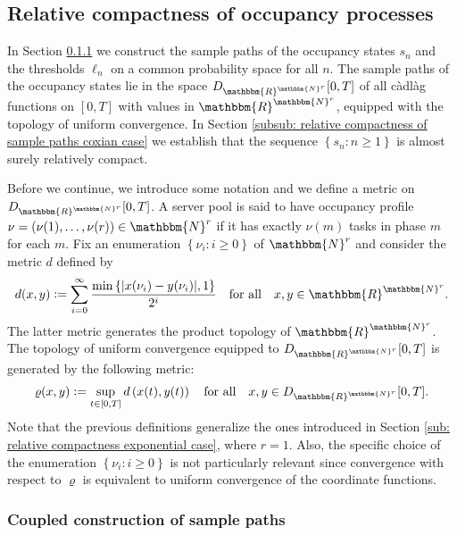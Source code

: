 \documentclass[a4paper, 12pt]{article}
\theoremstyle{definition}
\newcommand{\set}[2]{\left\{#1 : #2\right\}}
\newcommand{\defeq}{\vcentcolon=}
\newcommand{\N}{\mathbbm{N}}
\newcommand{\R}{\mathbbm{R}}
\begin{document}
\subsection{Relative compactness of occupancy processes}
\label{sub: relative compactness coxian case}

In Section \ref{subsub: coupled construction of sample paths coxian case} we construct the sample paths of the occupancy states $s_n$ and the thresholds $\ell_n$ on a common probability space for all $n$. The sample paths of the occupancy states lie in the space $D_{\R^{\N^r}}[0, T]$ of all c\`adl\`ag functions on $[0, T]$ with values in $\R^{\N^r}$, equipped with the topology of uniform convergence. In Section \ref{subsub: relative compactness of sample paths coxian case} we establish that the sequence $\set{s_n}{n \geq 1}$ is almost surely relatively compact.

Before we continue, we introduce some notation and we define a metric on $D_{\R^{\N^r}}[0, T]$. A server pool is said to have occupancy profile $\nu = \left(\nu(1), \dots, \nu(r)\right) \in \N^r$ if it has exactly $\nu(m)$ tasks in phase $m$ for each $m$. Fix an enumeration $\set{\nu_i}{i \geq 0}$ of $\N^r$ and consider the metric $d$ defined by
\begin{equation*}
	d(x, y) \defeq \sum_{i = 0}^\infty \frac{\min \left\{|x(\nu_i) - y(\nu_i)|, 1\right\}}{2^i} \quad \text{for all} \quad x, y \in \R^{\N^r}.
\end{equation*}
The latter metric generates the product topology of $\R^{\N^r}$. The topology of uniform convergence equipped to $D_{\R^{\N^r}}[0, T]$ is generated by the following metric:
\begin{equation*}
	\varrho(x, y) \defeq \sup_{t \in [0, T]} d\left(x(t), y(t)\right) \quad \text{for all} \quad x, y \in D_{\R^{\N^r}}[0, T].
\end{equation*}
Note that the previous definitions generalize the ones introduced in Section \ref{sub: relative compactness exponential case}, where $r = 1$. Also, the specific choice of the enumeration $\set{\nu_i}{i \geq 0}$ is not particularly relevant since convergence with respect to $\varrho$ is equivalent to uniform convergence of the coordinate functions.

\subsubsection{Coupled construction of sample paths}
\label{subsub: coupled construction of sample paths coxian case}
\end{document}
